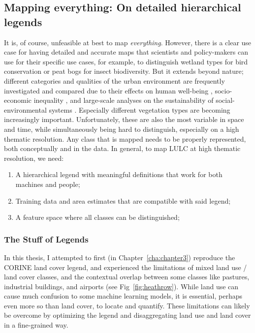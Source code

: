     \subsection{Mapping everything: On detailed hierarchical legends}
    \label{syn:everything}

        It is, of course, unfeasible at best to map \textit{everything}. However, there is a clear use case for having detailed and accurate maps that scientists and policy-makers can use for their specific use cases, for example, to distinguish wetland types for bird conservation \citep{fan2021function} or peat bogs \citep{spitzer2006insect} for insect biodiversity. But it extends beyond nature; different categories and qualities of the urban environment are frequently investigated and compared due to their effects on human well-being \citep{krekel2016greener}, socio-economic inequality \citep{tian2024urban}, and large-scale analyses on the sustainability of social-environmental systems \citep{chen2022sustainability}. Especially different vegetation types are becoming increasingly important. Unfortunately, these are also the most variable in space and time, while simultaneously being hard to distinguish, especially on a high thematic resolution. Any class that is mapped needs to be properly represented, both conceptually and in the data. In general, to map LULC at high thematic resolution, we need:
        \begin{enumerate}
        \item A hierarchical legend with meaningful definitions that work for both machines and people;
        \item Training data and area estimates that are compatible with said legend;
        \item A feature space where all classes can be distinguished;
        \end{enumerate}

        \subsubsection{The Stuff of Legends}
        \label{syn:everything-legends}

        In this thesis, I attempted to first (in Chapter\@~\ref{cha:chapter3}) reproduce the CORINE land cover legend, and experienced the limitations of mixed land use / land cover classes, and the contextual overlap between some classes like pastures, industrial buildings, and airports (see Fig\@~\ref{fig:heathrow}). While land use can cause much confusion to some machine learning models, it is essential, perhaps even more so than land cover, to locate and quantify. These limitations can likely be overcome by optimizing the legend and disaggregating land use and land cover in a fine-grained way.
        
